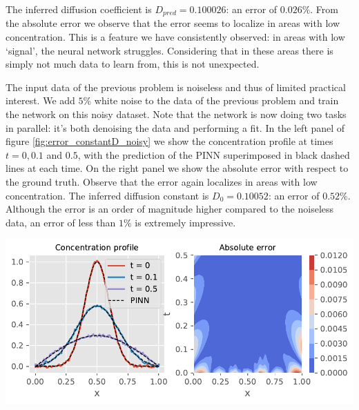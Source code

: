 \documentclass{Dissertate}
\let\origfigure\figure
\let\endorigfigure\endfigure
\renewenvironment{figure}[1][2] {
    \expandafter\origfigure\expandafter[H]
} {
    \endorigfigure
}
\begin{document}
The inferred diffusion coefficient is \(D_{pred} = 0.100026\): an error
of \(0.026\%\). From the absolute error we observe that the error seems
to localize in areas with low concentration. This is a feature we have
consistently observed: in areas with low `signal', the neural network
struggles. Considering that in these areas there is simply not much data
to learn from, this is not unexpected.

The input data of the previous problem is noiseless and thus of limited
practical interest. We add \(5\%\) white noise to the data of the
previous problem and train the network on this noisy dataset. Note that
the network is now doing two tasks in parallel: it's both denoising the
data and performing a fit. In the left panel of figure
\ref{fig:error_constantD_noisy} we show the concentration profile
at times \(t = 0, 0.1\) and \(0.5\), with the prediction of the PINN
superimposed in black dashed lines at each time. On the right panel we
show the absolute error with respect to the ground truth. Observe that
the error again localizes in areas with low concentration. The inferred
diffusion constant is \(D_0 = 0.10052\): an error of \(0.52\%\).
Although the error is an order of magnitude higher compared to the
noiseless data, an error of less than \(1\%\) is extremely impressive.

\begin{figure}
\hypertarget{fig:error_constantD_noisy}{%
\centering
\includegraphics{source/figures/pdf/error_constantD_noisy.pdf}
\caption{\textbf{Left panel}: The original noisy concentration profile
at several times with the neural network inferred denoised version
superimposed. \textbf{Right panel}: The absolute error of neural network
with respect to the ground truth. Note that most of the error is located
at areas with low concentration.}\label{fig:error_constantD_noisy}
}
\end{figure}
\end{document}
